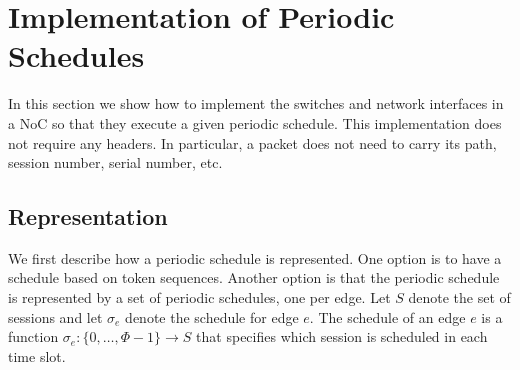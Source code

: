 \documentclass[a4paper,12pt]{article}
\newenvironment{proof sketch}[1]{\noindent {\emph{Proof sketch of #1:}}}{\hfill \qed}
\begin{document}
\begin{comment}
  It is also favorable to have a smooth execution (i.e., small jitter).  Namely, we
  would like the computation to progress at a fixed rate. Certain applications render
  this goal impossible, for example, video compression is very bursty due to sparse
  large I-frames and frequent small P-frames.  In such cases, smoothness can be
  measured in terms of groups of computation rounds (e.g., time that elapses between
  consecutive I-frames).
\end{comment}


\section{Implementation of Periodic Schedules}\label{sec:implementation}
In this section we show how to implement the switches and network interfaces in a NoC
so that they execute a given periodic schedule. This implementation does not require
any headers. In particular, a packet does not need to carry its path, session number,
serial number, etc.

\subsection{Representation}
We first describe how a periodic schedule is represented. One option is to have a
schedule based on token sequences. Another option is that the periodic schedule is
represented by a set of periodic schedules, one per edge. Let $S$ denote the set of
sessions  and let $\sigma_e$ denote the schedule for edge $e$. The
schedule of an edge $e$ is a function $\sigma_e: \{0,\ldots, \Phi-1\} \rightarrow S$
that specifies which session is scheduled in each time slot.
\end{document}
